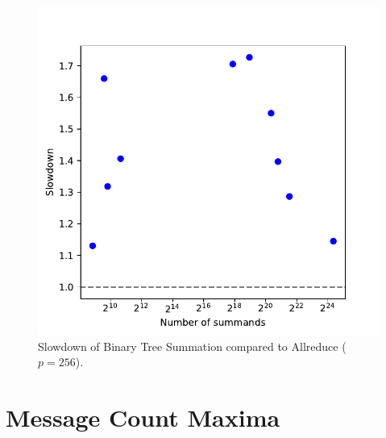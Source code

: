 \begin{figure}
\centering
\includegraphics[scale=\mScale]{figures/slowdownAllreduceTree.pdf}
\caption{Slowdown of Binary Tree Summation compared to Allreduce ($p = 256$).}
\label{fig:slowdownAllreduceTree}
\end{figure}

\newpage
\section{Message Count Maxima}

